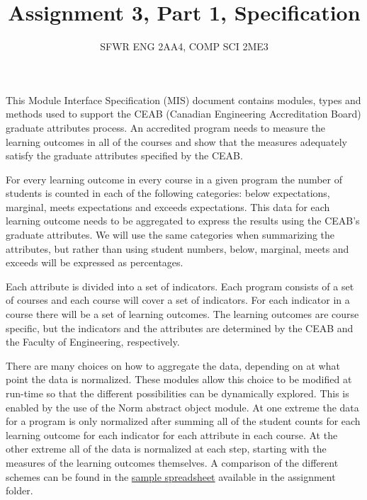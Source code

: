 \documentclass[12pt]{article}
\title{Assignment 3, Part 1, Specification}
\author{SFWR ENG 2AA4, COMP SCI 2ME3}
\begin{document}
\maketitle
This Module Interface Specification (MIS) document contains modules, types and
methods used to support the CEAB (Canadian Engineering Accreditation Board)
graduate attributes process.  An accredited program needs to measure the
learning outcomes in all of the courses and show that the measures adequately
satisfy the graduate attributes specified by the CEAB.

For every learning outcome in every course in a given program the number of
students is counted in each of the following categories: below expectations,
marginal, meets expectations and exceeds expectations.  This data for each
learning outcome needs to be aggregated to express the results using the CEAB's
graduate attributes.  We will use the same categories when summarizing the
attributes, but rather than using student numbers, below, marginal, meets and
exceeds will be expressed as percentages.

Each attribute is divided into a set of indicators.  Each program consists of a
set of courses and each course will cover a set of indicators.  For each
indicator in a course there will be a set of learning outcomes.  The learning
outcomes are course specific, but the indicators and the attributes are
determined by the CEAB and the Faculty of Engineering, respectively.

There are many choices on how to aggregate the data, depending on at what point
the data is normalized.  These modules allow this choice to be modified at
run-time so that the different possibilities can be dynamically explored.  This
is enabled by the use of the Norm abstract object module.  At one extreme the
data for a program is only normalized after summing all of the student counts
for each learning outcome for each indicator for each attribute in each course.
At the other extreme all of the data is normalized at each step, starting with
the measures of the learning outcomes themselves.  A comparison of the different
schemes can be found in the
\href{https://gitlab.cas.mcmaster.ca/smiths/se2aa4_cs2me3/-/blob/master/Assignments/A3/AggregationStrategies.xlsx}
{sample spreadsheet} available in the assignment folder.


\end{document}
